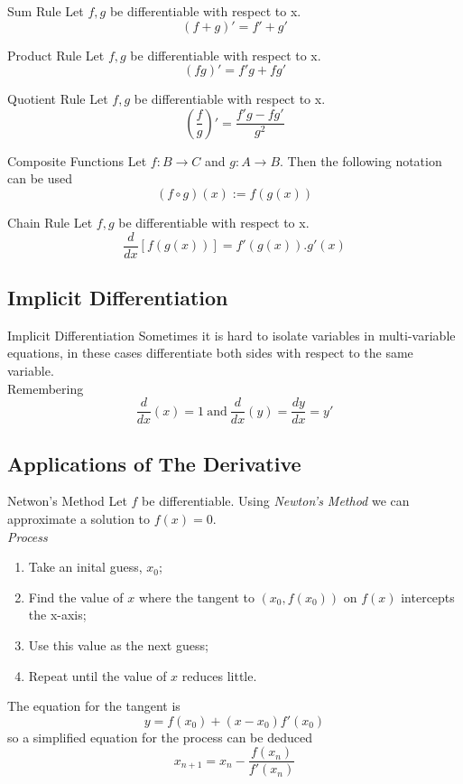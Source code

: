 \documentclass[11pt,a4paper]{article}
\begin{document}
\subtitle{Theorem 3.03 - }{Sum Rule}
Let $f, g$ be differentiable with respect to x.
$$(f+g)' = f' + g'$$

\subtitle{Theorem 3.04 - }{Product Rule}
Let $f, g$ be differentiable with respect to x.
$$(fg)' = f'g + fg'$$

\subtitle{Theorem 3.05 - }{Quotient Rule}
Let $f, g$ be differentiable with respect to x.
$$\left(\frac{f}{g}\right)' = \frac{f'g - fg'}{g^2}$$

\subtitle{Definition 3.06 - }{Composite Functions}
Let $f : B \to C$ and $g : A \to B$. Then the following notation can be used
$$(f \circ g)(x) := f(g(x))$$

\subtitle{Theorem 3.07 - }{Chain Rule}
Let $f, g$ be differentiable with respect to x.
$$\frac{d}{dx} \left[f(g(x))\right] = f'(g(x)).g'(x)$$

\subsection{Implicit Differentiation}

\subtitle{Definition 3.08 - }{Implicit Differentiation}
Sometimes it is hard to isolate variables in multi-variable equations, in these cases differentiate both sides with respect to the same variable. \\
Remembering $$\frac{d}{dx}(x) = 1\ \mathrm{and}\ \frac{d}{dx}(y) = \frac{dy}{dx} = y'$$

\subsection{Applications of The Derivative}

\subtitle{Thoerem 3.09 - }{Netwon's Method}
Let $f$ be differentiable. Using \textit{Newton's Method} we can approximate a solution to $f(x) = 0$.\\
\textit{Process}
\begin{enumerate}[label=\roman*)]
  \item Take an inital guess, $x_0$;
  \item Find the value of $x$ where the tangent to $\left(x_0, f(x_0)\right)$ on $f(x)$ intercepts the x-axis;
  \item Use this value as the next guess;
  \item Repeat until the value of $x$ reduces little.
\end{enumerate}
The equation for the tangent is
$$y = f(x_0) + (x - x_0)f'(x_0)$$
so a simplified equation for the process can be deduced
$$x_{n+1} = x_n - \frac{f(x_n)}{f'(x_n)}$$
\end{document}
